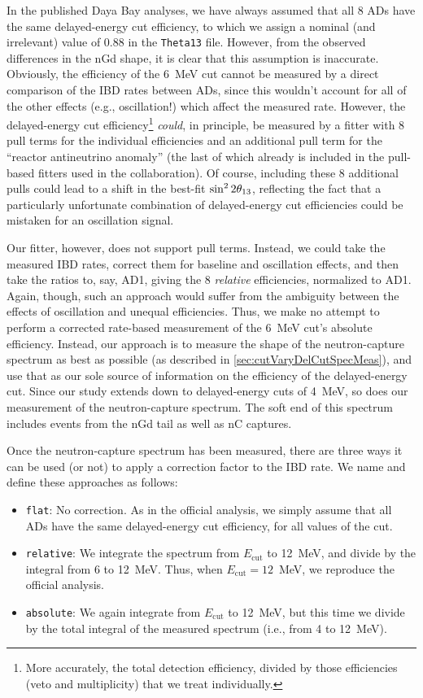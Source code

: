 \documentclass[../thesis.tex]{subfiles}
\begin{document}
In the published Daya Bay analyses, we have always assumed that all 8 ADs have the same delayed-energy cut efficiency, to which we assign a nominal (and irrelevant) value of 0.88 in the \texttt{Theta13} file. However, from the observed differences in the nGd shape, it is clear that this assumption is inaccurate. Obviously, the efficiency of the 6~MeV cut cannot be measured by a direct comparison of the IBD rates between ADs, since this wouldn't account for all of the other effects (e.g., oscillation!) which affect the measured rate. However, the delayed-energy cut efficiency\footnote{More accurately, the total detection efficiency, divided by those efficiencies (veto and multiplicity) that we treat individually.} \emph{could}, in principle, be measured by a fitter with 8 pull terms for the individual efficiencies and an additional pull term for the ``reactor antineutrino anomaly'' (the last of which already is included in the pull-based fitters used in the collaboration). Of course, including these 8 additional pulls could lead to a shift in the best-fit $\sin^2 2\theta_{13}$, reflecting the fact that a particularly unfortunate combination of delayed-energy cut efficiencies could be mistaken for an oscillation signal.

Our fitter, however, does not support pull terms. Instead, we could take the measured IBD rates, correct them for baseline and oscillation effects, and then take the ratios to, say, AD1, giving the 8 \emph{relative} efficiencies, normalized to AD1. Again, though, such an approach would suffer from the ambiguity between the effects of oscillation and unequal efficiencies. Thus, we make no attempt to perform a corrected rate-based measurement of the 6~MeV cut's absolute efficiency. Instead, our approach is to measure the shape of the neutron-capture spectrum as best as possible (as described in \autoref{sec:cutVaryDelCutSpecMeas}), and use that as our sole source of information on the efficiency of the delayed-energy cut. Since our study extends down to delayed-energy cuts of 4~MeV, so does our measurement of the neutron-capture spectrum. The soft end of this spectrum includes events from the nGd tail as well as nC captures.

Once the neutron-capture spectrum has been measured, there are three ways it can be used (or not) to apply a correction factor to the IBD rate. We name and define these approaches as follows:

\begin{itemize}
\item \texttt{flat}: No correction. As in the official analysis, we simply assume that all ADs have the same delayed-energy cut efficiency, for all values of the cut.
\item \texttt{relative}: We integrate the spectrum from $E_{\mathrm{cut}}$ to 12~MeV, and divide by the integral from 6 to 12~MeV. Thus, when $E_{\mathrm{cut}} = 12$~MeV, we reproduce the official analysis.
\item \texttt{absolute}: We again integrate from $E_{\mathrm{cut}}$ to 12~MeV, but this time we divide by the total integral of the measured spectrum (i.e., from 4 to 12~MeV).
\end{itemize}
\end{document}

